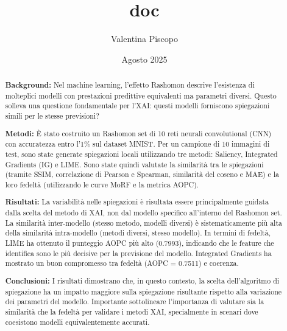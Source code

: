 \documentclass[12pt,a4paper,oneside]{report}
\title{doc}
\author{Valentina Piscopo}
\date{Agosto 2025}
\numberwithin{figure}{chapter}
\numberwithin{table}{chapter}
\begin{document}
\maketitle

\begin{abstract}
      \noindent
      \textbf{Background:} Nel machine learning, l'effetto Rashomon descrive l'esistenza di molteplici modelli con prestazioni predittive equivalenti ma parametri diversi. Questo solleva una questione fondamentale per l'XAI: questi modelli forniscono spiegazioni simili per le stesse previsioni?

      \vspace{0.5em}

      \noindent
      \textbf{Metodi:} È stato costruito un Rashomon set di 10 reti neurali convolutional (CNN) con accuratezza entro l'1\% sul dataset MNIST. Per un campione di 10 immagini di test, sono state generate spiegazioni locali utilizzando tre metodi: Saliency, Integrated Gradients (IG) e LIME. Sono state quindi valutate la similarità tra le spiegazioni (tramite SSIM, correlazione di Pearson e Spearman, similarità del coseno e MAE) e la loro fedeltà (utilizzando le curve MoRF e la metrica AOPC).

      \vspace{0.5em}

      \noindent
      \textbf{Risultati:} La variabilità nelle spiegazioni è risultata essere principalmente guidata dalla scelta del metodo di XAI, non dal modello specifico all'interno del Rashomon set. La similarità inter-modello (stesso metodo, modelli diversi) è sistematicamente più alta della similarità intra-modello (metodi diversi, stesso modello). In termini di fedeltà, LIME ha ottenuto il punteggio AOPC più alto (0.7993), indicando che le feature che identifica sono le più decisive per la previsione del modello. Integrated Gradients ha mostrato un buon compromesso tra fedeltà (AOPC = 0.7511) e coerenza.

      \vspace{0.5em}

      \noindent
      \textbf{Conclusioni:} I risultati dimostrano che, in questo contesto, la scelta dell'algoritmo di spiegazione ha un impatto maggiore sulla spiegazione risultante rispetto alla variazione dei parametri del modello. Importante sottolineare l'importanza di valutare sia la similarità che la fedeltà per validare i metodi XAI, specialmente in scenari dove coesistono modelli equivalentemente accurati.
\end{abstract}
\newpage
\end{document}

